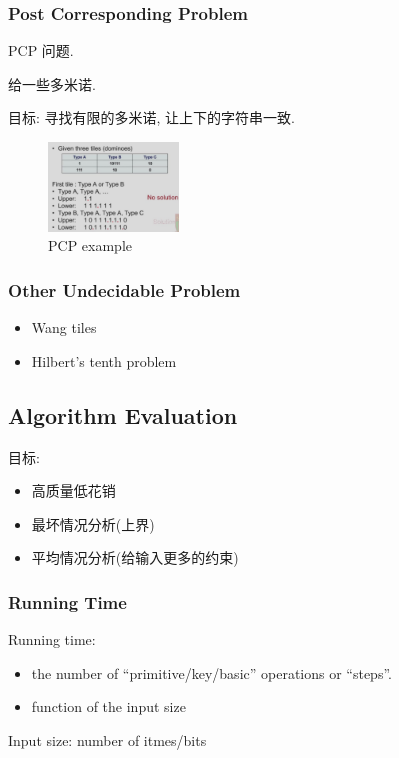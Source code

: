 \subsubsection{Post Corresponding Problem}
PCP 问题. 

给一些多米诺.

目标: 寻找有限的多米诺, 让上下的字符串一致.

\begin{figure}[!htb]
    \centering
    \includegraphics[width=0.309\textwidth]{pic/DAA1/PCP.png}
    \caption{PCP example}
\end{figure}


\subsubsection{Other Undecidable Problem}
\begin{itemize}
    \item Wang tiles
    \item Hilbert's tenth problem
\end{itemize}

\subsection{Algorithm Evaluation}
目标:
\begin{itemize}
    \item 高质量低花销
    \item 最坏情况分析(上界)
    \item 平均情况分析(给输入更多的约束)
\end{itemize}

\subsubsection{Running Time}
\begin{definition}
    Running time: 
    \begin{itemize}
        \item the number of ``primitive/key/basic'' operations or ``steps''. 
        \item function of the input size 
    \end{itemize}
\end{definition}
Input size: number of itmes/bits

